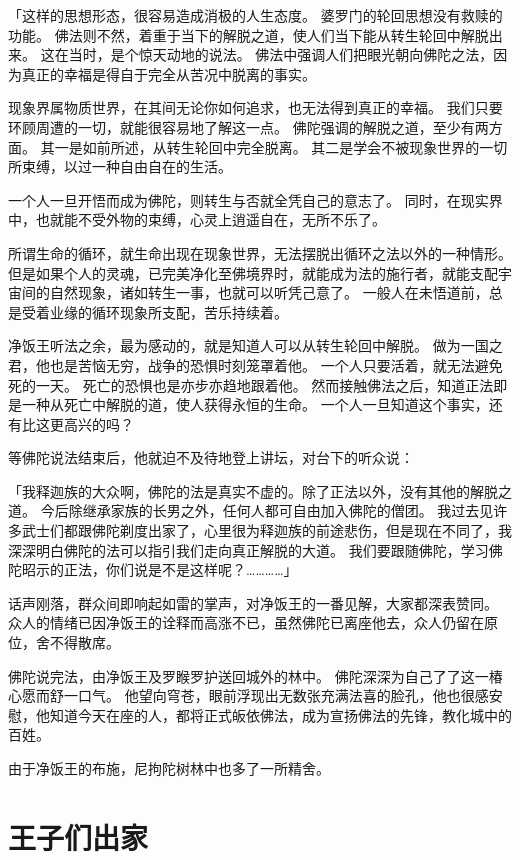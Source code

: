 \documentclass[twoside,openany]{book}
\begin{document}
「这样的思想形态，很容易造成消极的人生态度。
婆罗门的轮回思想没有救赎的功能。
佛法则不然，着重于当下的解脱之道，使人们当下能从转生轮回中解脱出来。
这在当时，是个惊天动地的说法。
佛法中强调人们把眼光朝向佛陀之法，因为真正的幸福是得自于完全从苦况中脱离的事实。

现象界属物质世界，在其间无论你如何追求，也无法得到真正的幸福。
我们只要环顾周遭的一切，就能很容易地了解这一点。
佛陀强调的解脱之道，至少有两方面。
其一是如前所述，从转生轮回中完全脱离。
其二是学会不被现象世界的一切所束缚，以过一种自由自在的生活。

一个人一旦开悟而成为佛陀，则转生与否就全凭自己的意志了。
同时，在现实界中，也就能不受外物的束缚，心灵上逍遥自在，无所不乐了。

所谓生命的循环，就生命出现在现象世界，无法摆脱出循环之法以外的一种情形。
但是如果个人的灵魂，已完美净化至佛境界时，就能成为法的施行者，就能支配宇宙间的自然现象，诸如转生一事，也就可以听凭己意了。
一般人在未悟道前，总是受着业缘的循环现象所支配，苦乐持续着。

净饭王听法之余，最为感动的，就是知道人可以从转生轮回中解脱。
做为一国之君，他也是苦恼无穷，战争的恐惧时刻笼罩着他。
一个人只要活着，就无法避免死的一天。
死亡的恐惧也是亦步亦趋地跟着他。
然而接触佛法之后，知道正法即是一种从死亡中解脱的道，使人获得永恒的生命。
一个人一旦知道这个事实，还有比这更高兴的吗？

等佛陀说法结束后，他就迫不及待地登上讲坛，对台下的听众说：

「我释迦族的大众啊，佛陀的法是真实不虚的。除了正法以外，没有其他的解脱之道。
今后除继承家族的长男之外，任何人都可自由加入佛陀的僧团。
我过去见许多武士们都跟佛陀剃度出家了，心里很为释迦族的前途悲伤，但是现在不同了，我深深明白佛陀的法可以指引我们走向真正解脱的大道。
我们要跟随佛陀，学习佛陀昭示的正法，你们说是不是这样呢？…………」

话声刚落，群众间即响起如雷的掌声，对净饭王的一番见解，大家都深表赞同。
众人的情绪已因净饭王的诠释而高涨不已，虽然佛陀已离座他去，众人仍留在原位，舍不得散席。

佛陀说完法，由净饭王及罗睺罗护送回城外的林中。
佛陀深深为自己了了这一椿心愿而舒一口气。
他望向穹苍，眼前浮现出无数张充满法喜的脸孔，他也很感安慰，他知道今天在座的人，都将正式皈依佛法，成为宣扬佛法的先锋，教化城中的百姓。

由于净饭王的布施，尼拘陀树林中也多了一所精舍。

\section{王子们出家}\label{sec8.5}
\end{document}
